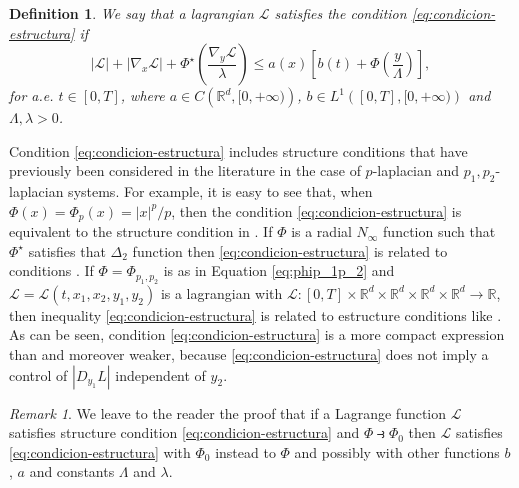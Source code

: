 \documentclass[twoside]{article}
\newtheorem{defi}[thm]{Definition}
\theoremstyle{remark}
\newtheorem{comentario}{Remark}
\newcounter{example}[section]
\newcommand{\rr}{\mathbb{R}}
\renewcommand{\leq}{\leqslant}
\begin{document}
\begin{defi}\label{def:estructura} We say that a lagrangian $\mathcal{L}$ satisfies the condition \eqref{eq:condicion-estructura} if
\begin{equation}\label{eq:condicion-estructura}
  |\mathcal{L}|+ |\nabla_{x}\mathcal{L}|+\Phi^{\star}\left(\frac{\nabla_{y}\mathcal{L}}{\lambda}\right)
\leq
a(x)\left[b(t)+ \Phi\left(\frac{y}{\Lambda}\right)\right], \tag{$S$}
\end{equation}
for a.e. $t\in [0,T]$,
where  $a\in C\left(\mathbb{R}^d,[0,+\infty)\right)$, $b\in L^1\left([0,T],[0,+\infty)\right) $ and $\Lambda,\lambda>0$.
\end{defi}

Condition \eqref{eq:condicion-estructura} includes structure conditions that have previously been considered in the literature in the case of $p$-laplacian and $p_1,p_2$-laplacian systems. For example, it is easy to see that, when $\Phi(x)=\Phi_p(x)=|x|^p/p$, then  the condition \eqref{eq:condicion-estructura}  is equivalent to the structure condition in  \cite[Th. 1.4]{mawhin2010critical}.  If $\Phi$ is a radial $N_{\infty}$ function such that $\Phi^{\star}$ satisfies that $\Delta_2$ function  then \eqref{eq:condicion-estructura} is related to conditions  \cite[Eq. (2)-(4)]{ABGMS2015}.   If $\Phi=\Phi_{p_1,p_2}$ is as in Equation \eqref{eq:phip_1p_2} and $\mathcal{L}=\mathcal{L}(t,x_1,x_2,y_1,y_2)$ is a lagrangian with $\mathcal{L}:[0,T]\times\rr^d\times\rr^d\times\rr^d\times\rr^d\to\rr$, then inequality \eqref{eq:condicion-estructura} is related to estructure conditions like
\cite[Lemma 3.1, Eq. (3.1)]{Tian2007192}. As can be seen, condition \eqref{eq:condicion-estructura} is a more compact expression than \cite[Lemma 3.1, Eq. (3.1)]{Tian2007192} and moreover   weaker, because  \eqref{eq:condicion-estructura} does not imply a control of
$|D_{y_1}L|$ independent of $y_2$. 



\begin{comentario} We leave to the reader the proof that if a Lagrange function $\mathcal{L}$ satisfies structure condition \eqref{eq:condicion-estructura} and $\Phi\strictif \Phi_0$ then $\mathcal{L}$ satisfies \eqref{eq:condicion-estructura} with $\Phi_0$ instead to $\Phi$ and possibly with other functions $b$, $a$ and constants $\Lambda$ and $\lambda$.
 \end{comentario}
\end{document}
